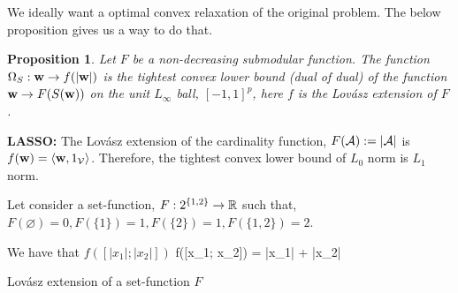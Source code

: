 \documentclass[11pt]{article}
\newtheorem{proposition}{Proposition}{\bf}{\it}
\begin{document}
We ideally want a optimal convex relaxation of the original problem. The below proposition gives us a way to do that.
\begin{proposition}
Let $F$ be a non-decreasing submodular function. The function $\Omega_{S}: {\bf w} \to f(|{\bf w}|)$ is the tightest convex lower
bound (dual of dual) of the function ${\bf w} \to F(S({\bf w}))$ on the unit $L_{\infty}$ ball, $[-1, 1]^p$, here $f$ is 
the Lovász extension of $F$.
\end{proposition}

\textbf{LASSO:} The Lovász extension of the cardinality function, $F({\cal A}) := |{\cal A}|$ is $f({\bf w}) = \langle {\bf w} , 1_{{\cal V}} \rangle$.
Therefore, the tightest convex lower bound of $L_0$ norm is $L_1$ norm.



Let consider a set-function, $F : 2^{\{1, 2\}} \to {\mathbb R}$
such that, $F(\varnothing) = 0, F(\{1\}) = 1, F(\{2\}) = 1, F(\{1, 2\}) = 2$.
  
We have that $f([|x_1|; |x_2|])$
\bd
f([x_1; x_2]) = |x_1| + |x_2|
\ed
\bfig[h!]
\centering
{}
\caption{Lovász extension of a set-function $F$}
\efig





\end{document}
